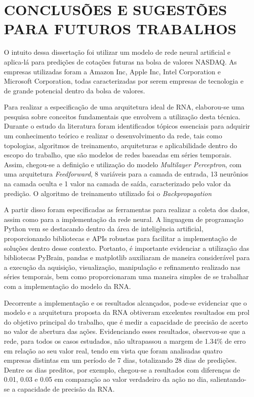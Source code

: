 
\chapter{CONCLUSÕES E SUGESTÕES PARA FUTUROS TRABALHOS}\label{ch:conclusao}
O intuito dessa dissertação foi utilizar um modelo de rede neural artificial e aplica-lá para predições de cotações futuras na bolsa de valores NASDAQ. As empresas utilizadas foram a Amazon Inc, Apple Inc, Intel Corporation e Microsoft Corporation, todas caracterizadas por serem empresas de tecnologia e de grande potencial dentro da bolsa de valores.

Para realizar a especificação de uma arquitetura ideal de RNA, elaborou-se uma pesquisa sobre conceitos fundamentais que envolvem a utilização desta técnica. Durante o estudo da literatura foram identificados tópicos essenciais para adquirir um conhecimento teórico e realizar o desenvolvimento da rede, tais como topologias, algoritmos de treinamento, arquiteturas e aplicabilidade dentro do escopo do trabalho, que são modelos de redes baseadas em séries temporais. Assim, chegou-se a definição e utilização do modelo \textit{Multilayer Perceptron}, com uma arquitetura \textit{Feedforward}, 8 variáveis para a camada de entrada, 13 neurônios na camada oculta e 1 valor na camada de saída, caracterizado pelo valor da predição. O algoritmo de treinamento utilizado foi o \textit{Backpropagation} 

A partir disso foram especificadas as ferramentas para realizar a coleta dos dados, assim como para a implementação da rede neural. A linguagem de programação Python vem se destacando dentro da área de inteligência artificial, proporcionando bibliotecas e APIs robustas para facilitar a implementação de soluções dentro desse contexto. Portanto, é importante evidenciar a utilização das bibliotecas PyBrain, pandas e matplotlib auxiliaram de maneira considerável para a execução da aquisição, visualização, manipulação e refinamento realizado nas séries temporais, bem como proporcionaram uma maneira simples de se trabalhar com a implementação do modelo da RNA.

Decorrente a implementação e os resultados alcançados, pode-se evidenciar que o modelo e a arquitetura proposta da RNA obtiveram excelentes resultados em prol do objetivo principal do trabalho, que é medir a capacidade de precisão de acerto no valor de abertura das ações. Evidenciando esses resultados, observou-se que a rede, para todos os casos estudados, não ultrapassou a margem de 1.34\% de erro em relação ao seu valor real, tendo em vista que foram analisadas quatro empresas distintas em um período de 7 dias, totalizando 28 dias de predições. Dentre os dias preditos, por exemplo, chegou-se a resultados com diferenças de 0.01, 0.03 e 0.05 em comparação ao valor verdadeiro da ação no dia, salientando-se a capacidade de precisão da RNA. 

